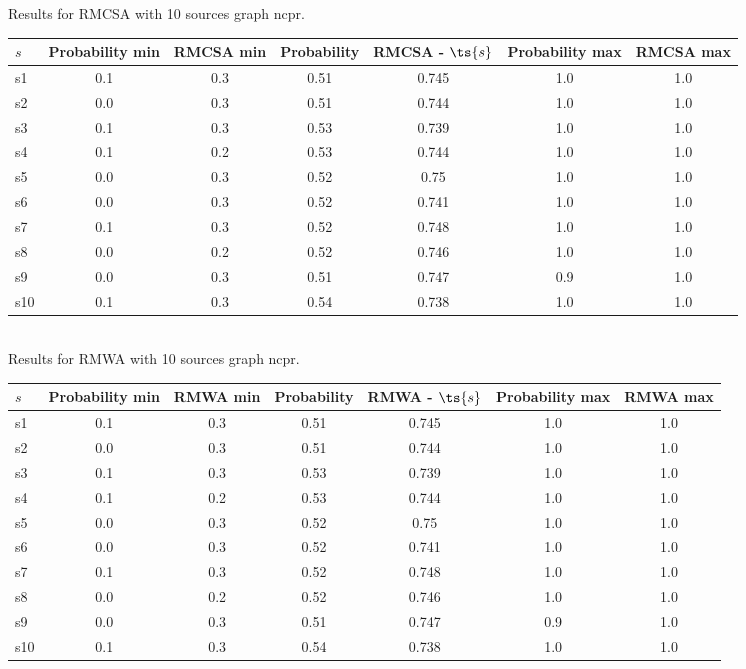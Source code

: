 \documentclass{article}
\begin{document}
\noindent Results for RMCSA with 10 sources graph ncpr.

\noindent\begin{tabular}{|l|c|c|c|c|c|c|}
\hline
$s$& Probability min & RMCSA min & Probability & RMCSA - $\ts{s}$ & Probability max & RMCSA max\\
\hline
s1 &0.1 & 0.3 & 0.51 & 0.745 & 1.0 & 1.0\\
\hline
s2 &0.0 & 0.3 & 0.51 & 0.744 & 1.0 & 1.0\\
\hline
s3 &0.1 & 0.3 & 0.53 & 0.739 & 1.0 & 1.0\\
\hline
s4 &0.1 & 0.2 & 0.53 & 0.744 & 1.0 & 1.0\\
\hline
s5 &0.0 & 0.3 & 0.52 & 0.75 & 1.0 & 1.0\\
\hline
s6 &0.0 & 0.3 & 0.52 & 0.741 & 1.0 & 1.0\\
\hline
s7 &0.1 & 0.3 & 0.52 & 0.748 & 1.0 & 1.0\\
\hline
s8 &0.0 & 0.2 & 0.52 & 0.746 & 1.0 & 1.0\\
\hline
s9 &0.0 & 0.3 & 0.51 & 0.747 & 0.9 & 1.0\\
\hline
s10 &0.1 & 0.3 & 0.54 & 0.738 & 1.0 & 1.0\\
\hline
\end{tabular}\\

\noindent Results for RMWA with 10 sources graph ncpr.

\noindent\begin{tabular}{|l|c|c|c|c|c|c|}
\hline
$s$& Probability min & RMWA min & Probability & RMWA - $\ts{s}$ & Probability max & RMWA max\\
\hline
s1 &0.1 & 0.3 & 0.51 & 0.745 & 1.0 & 1.0\\
\hline
s2 &0.0 & 0.3 & 0.51 & 0.744 & 1.0 & 1.0\\
\hline
s3 &0.1 & 0.3 & 0.53 & 0.739 & 1.0 & 1.0\\
\hline
s4 &0.1 & 0.2 & 0.53 & 0.744 & 1.0 & 1.0\\
\hline
s5 &0.0 & 0.3 & 0.52 & 0.75 & 1.0 & 1.0\\
\hline
s6 &0.0 & 0.3 & 0.52 & 0.741 & 1.0 & 1.0\\
\hline
s7 &0.1 & 0.3 & 0.52 & 0.748 & 1.0 & 1.0\\
\hline
s8 &0.0 & 0.2 & 0.52 & 0.746 & 1.0 & 1.0\\
\hline
s9 &0.0 & 0.3 & 0.51 & 0.747 & 0.9 & 1.0\\
\hline
s10 &0.1 & 0.3 & 0.54 & 0.738 & 1.0 & 1.0\\
\hline
\end{tabular}\\
\end{document}
